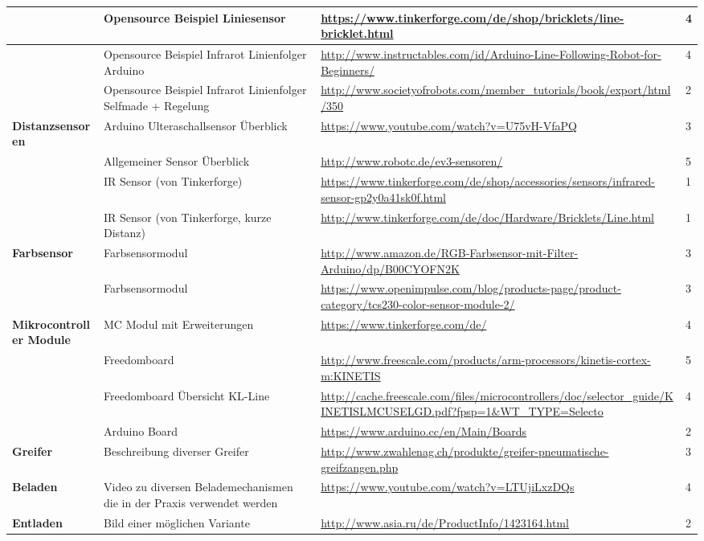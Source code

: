 \begin{tabular}{|p{3cm}|p{3.5cm}|p{5cm}|p{2cm}|}\hline
				 			&	Opensource Beispiel Liniesensor	&	\url{https://www.tinkerforge.com/de/shop/bricklets/line-bricklet.html}	&	4 \\\hline
 				 			&	Opensource Beispiel Infrarot Linienfolger Arduino	&	\url{http://www.instructables.com/id/Arduino-Line-Following-Robot-for-Beginners/}	&	4 \\\hline
 				 			&	Opensource Beispiel Infrarot Linienfolger Selfmade + Regelung	&	\url{http://www.societyofrobots.com/member_tutorials/book/export/html/350}	&	2 \\\hline
 \textbf{Distanzsensoren}	&	Arduino Ulteraschallsensor Überblick &	\url{https://www.youtube.com/watch?v=U75vH-VfaPQ}	&	3 \\\hline	
 							&	Allgemeiner Sensor Überblick &	\url{http://www.robotc.de/ev3-sensoren/}	&	5 \\\hline	
 							&	IR Sensor (von Tinkerforge) &	\url{https://www.tinkerforge.com/de/shop/accessories/sensors/infrared-sensor-gp2y0a41sk0f.html}	&	1 \\\hline	
 							&	IR Sensor (von Tinkerforge, kurze Distanz) &	\url{http://www.tinkerforge.com/de/doc/Hardware/Bricklets/Line.html}	&	1 \\\hline	
 							
 							


\textbf{Farbsensor}	&	Farbsensormodul	&	\url{http://www.amazon.de/RGB-Farbsensor-mit-Filter-Arduino/dp/B00CYOFN2K}	&	3 \\\hline	
					&	Farbsensormodul	&	\url{https://www.openimpulse.com/blog/products-page/product-category/tcs230-color-sensor-module-2/}	&	3 \\\hline
		 		
\textbf{Mikrocontroller Module}	&	MC Modul mit Erweiterungen	&	\url{https://www.tinkerforge.com/de/}	&	4 \\\hline
					&	Freedomboard	&	\url{http://www.freescale.com/products/arm-processors/kinetis-cortex-m:KINETIS}	&	5 \\\hline
					&	Freedomboard Übersicht KL-Line	&	\url{http://cache.freescale.com/files/microcontrollers/doc/selector_guide/KINETISLMCUSELGD.pdf?fpsp=1&WT_TYPE=Selecto}	&	4 \\\hline
					
					
					&	Arduino Board &	\url{https://www.arduino.cc/en/Main/Boards}	&	2 \\\hline					
					
\textbf{Greifer}	& 	Beschreibung diverser Greifer & \url{http://www.zwahlenag.ch/produkte/greifer-pneumatische-greifzangen.php} & 3 \\\hline	
\textbf{Beladen}	& 	Video zu diversen Belademechanismen die in der Praxis verwendet werden & \url{https://www.youtube.com/watch?v=LTUjiLxzDQs} & 4 \\\hline
\textbf{Entladen}	& 	Bild einer möglichen Variante & \url{http://www.asia.ru/de/ProductInfo/1423164.html} & 2 \\\hline	
\end{tabular}
